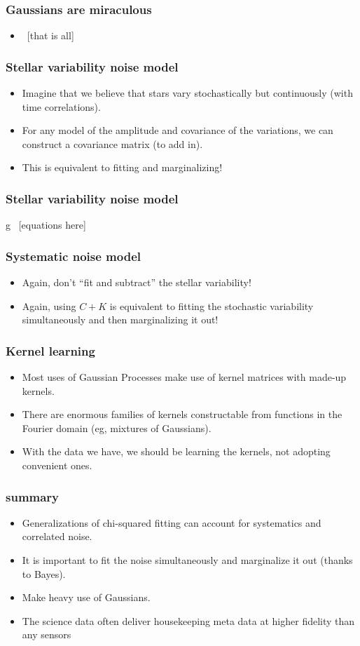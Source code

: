 \documentclass[pdftex]{beamer}
\newcommand{\conclusions}{%
\begin{frame}
  \frametitle{summary}
  \begin{itemize}
  \item Generalizations of chi-squared fitting can account for
    systematics and correlated noise.
  \item It is important to fit the noise simultaneously and
    marginalize it out (thanks to Bayes).
  \item Make heavy use of Gaussians.
  \item The science data often deliver housekeeping meta data at
    higher fidelity than any sensors
  \end{itemize}
\end{frame}}
\begin{document}
\begin{frame}
  \frametitle{Gaussians are miraculous}
  \begin{itemize}
  \item ~[that is all]
  \end{itemize}
\end{frame}

\begin{frame}
  \frametitle{Stellar variability noise model}
  \begin{itemize}
  \item Imagine that we believe that stars vary stochastically but
    continuously (with time correlations).
  \item For any model of the amplitude and covariance of the
    variations, we can construct a covariance matrix (to add in).
  \item This is equivalent to fitting and marginalizing!
  \end{itemize}
\end{frame}

\begin{frame}
  \frametitle{Stellar variability noise model}
g~ [equations here]
\end{frame}

\begin{frame}
  \frametitle{Systematic noise model}
  \begin{itemize}
  \item Again, don't ``fit and subtract'' the stellar variability!
  \item Again, using $C + K$ is equivalent to fitting the stochastic
    variability simultaneously and then marginalizing it out!
  \end{itemize}
\end{frame}

\begin{frame}
  \frametitle{Kernel learning}
  \begin{itemize}
  \item Most uses of Gaussian Processes make use of kernel matrices
    with made-up kernels.
  \item There are enormous families of kernels constructable from
    functions in the Fourier domain (eg, mixtures of Gaussians).
  \item With the data we have, we should be learning the kernels, not
    adopting convenient ones.
  \end{itemize}
\end{frame}

\conclusions
\end{document}
